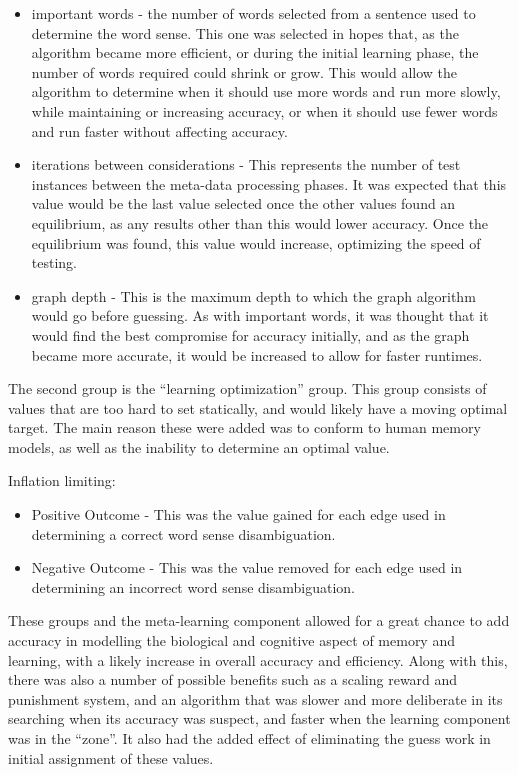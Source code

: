 \begin{itemize}
\item important words - the number of words selected from a sentence used to 
determine the word sense. This one was selected in hopes that, as the algorithm 
became more efficient, or during the initial learning phase, the number of words 
required could shrink or grow. This would allow the algorithm to determine when 
it should use more words and run more slowly, while maintaining or increasing 
accuracy, or when it should use fewer words and run faster without affecting 
accuracy.     

\item iterations between considerations - This represents the number of test 
instances between the meta-data processing phases. It was expected that this value would be 
the last value selected once the other values found an equilibrium, as any 
results other than this would lower accuracy. Once the equilibrium was found, 
this value would increase, optimizing the speed of testing.

\item graph depth - This is the maximum depth to which the graph algorithm would go before 
guessing.  As with important words, it was thought that it would find the best 
compromise for accuracy initially, and as the graph became more accurate, it 
would be increased to allow for faster runtimes.

\end{itemize}

The second group is the ``learning optimization'' group.  This group consists of
values that are too hard to set statically, and would likely have a moving optimal 
target. The main reason these were added was to conform to human memory models, as well 
as the inability to determine an optimal value.

Inflation limiting: 
\begin{itemize}     
\item Positive Outcome - This was the value gained for each edge used in 
determining a correct word sense disambiguation.      
\item Negative Outcome - This was the value removed for each edge used in 
determining an incorrect word sense disambiguation.
\end{itemize}

These groups and the meta-learning component allowed for a great chance to add
accuracy in modelling the biological and cognitive aspect of memory and learning,
with a likely increase in overall accuracy and efficiency. Along with
this, there was also a number of possible benefits such as a scaling reward and
punishment system, and an algorithm that was slower and more deliberate in its
searching when its accuracy was suspect, and faster when the learning component
was in the ``zone''.  It also had the added effect of eliminating the guess work
in initial assignment of these values.
